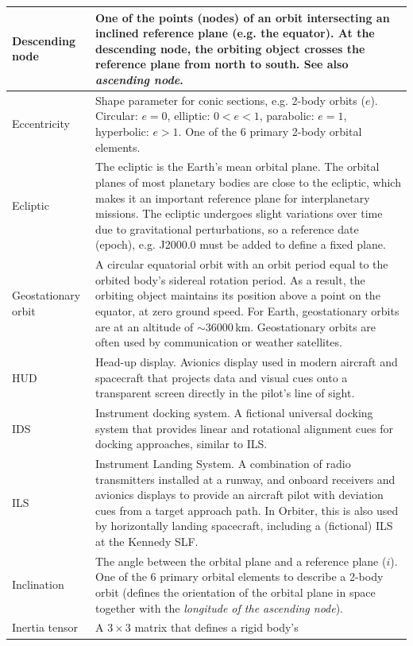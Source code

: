 \documentclass[Orbiter User Manual.tex]{subfiles}
\begin{document}
\begin{longtable}{ >{\RaggedRight}p{} p{} }
	\hline
	Descending node & One of the points (nodes) of an orbit intersecting an
		inclined reference plane (e.g. the equator). At the descending node, the
		orbiting object crosses the reference plane from north to south. See
		also \emph{ascending node}.\\
	\hline
	Eccentricity & Shape parameter for conic sections, e.g. 2-body orbits ($e$).
		Circular: $e = 0$, elliptic: $0 < e < 1$, parabolic: $e = 1$,
		hyperbolic: $e > 1$. One of the 6 primary 2-body orbital elements.\\
	\hline
	Ecliptic & The ecliptic is the Earth's mean orbital plane. The orbital
		planes of most planetary bodies are close to the ecliptic, which makes
		it an important reference plane for interplanetary missions. The
		ecliptic undergoes slight variations over time due to gravitational
		perturbations, so a reference date (epoch), e.g. J2000.0 must be added
		to define a fixed plane.\\
	\hline
	Geostationary orbit & A circular equatorial orbit with an orbit period equal
		to the orbited body's sidereal rotation period. As a result, the
		orbiting object maintains its position above a point on the equator,
		at zero ground speed. For Earth, geostationary orbits are at an altitude
		of $\sim$36000\,km.
		Geostationary orbits are often used by communication or weather
		satellites.\\
	\hline
	HUD & Head-up display. Avionics display used in modern aircraft and
		spacecraft that projects data and visual cues onto a transparent screen
		directly in the pilot's line of sight.\\
	\hline
	IDS & Instrument docking system. A fictional universal docking system that
		provides linear and rotational alignment cues for docking approaches,
		similar to ILS.\\
	\hline
	ILS & Instrument Landing System. A combination of radio transmitters
		installed at a runway, and onboard receivers and avionics displays to
		provide an aircraft pilot with deviation cues from a target approach
		path. In Orbiter, this is also used by horizontally landing spacecraft,
		including a (fictional) ILS at the Kennedy SLF.\\
	\hline
	Inclination & The angle between the orbital plane and a reference plane
		($i$). One of the 6 primary orbital elements to describe a 2-body orbit
		(defines the orientation of the orbital plane in space together with
		the \emph{longitude of the ascending node}).\\
	\hline
	Inertia tensor & A 3\,$\times$\,3 matrix that defines a rigid body's

\end{longtable}
\end{document}
